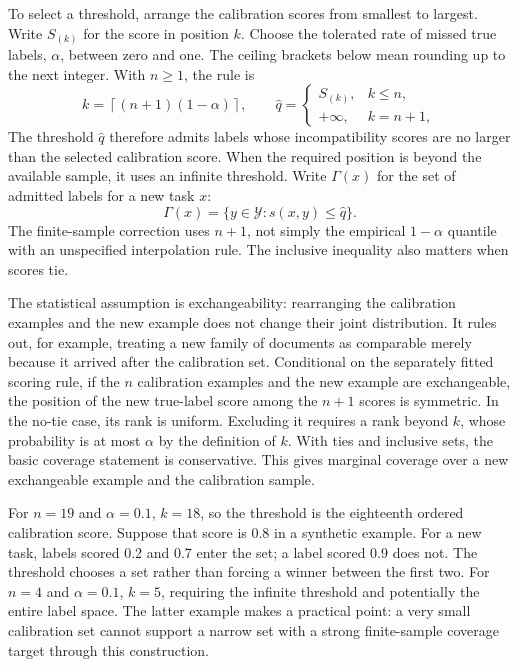 To select a threshold, arrange the calibration scores from smallest to largest.
Write $S_{(k)}$ for the score in position $k$. Choose the tolerated rate of missed
true labels, $\alpha$, between zero and one. The ceiling brackets below mean
rounding up to the next integer. With $n\geq1$, the rule is
\begin{equation}
 k=\left\lceil(n+1)(1-\alpha)\right\rceil,
 \qquad
 \widehat q=\begin{cases}
 S_{(k)},&k\leq n,\\
 +\infty,&k=n+1,
 \end{cases}
 \label{eq:conformal-quantile}
\end{equation}
The threshold $\widehat q$ therefore admits labels whose incompatibility scores
are no larger than the selected calibration score. When the required position is
beyond the available sample, it uses an infinite threshold. Write $\Gamma(x)$
for the set of admitted labels for a new task $x$:
\begin{equation}
 \Gamma(x)=\{y\in\mathcal Y:s(x,y)\leq\widehat q\}.
 \label{eq:conformal-set}
\end{equation}
The finite-sample correction uses $n+1$, not simply the empirical $1-\alpha$
quantile with an unspecified interpolation rule. The inclusive inequality also
matters when scores tie.

The statistical assumption is exchangeability: rearranging the calibration
examples and the new example does not change their joint distribution. It rules
out, for example, treating a new family of documents as comparable merely because
it arrived after the calibration set. Conditional on the separately fitted scoring rule, if the
$n$ calibration examples and the new example are exchangeable, the position of
the new true-label score among the $n+1$ scores is symmetric. In the no-tie case,
its rank is uniform. Excluding it requires a rank beyond $k$, whose probability
is at most $\alpha$ by the definition of $k$. With ties and inclusive sets, the
basic coverage statement is conservative. This gives marginal coverage over a
new exchangeable example and the calibration sample.


For $n=19$ and $\alpha=0.1$, $k=18$, so the threshold is the eighteenth ordered
calibration score. Suppose that score is 0.8 in a synthetic example. For a new
task, labels scored 0.2 and 0.7 enter the set; a label scored 0.9 does not. The
threshold chooses a set rather than forcing a winner between the first two.
For $n=4$ and $\alpha=0.1$, $k=5$, requiring the infinite
threshold and potentially the entire label space. The latter example makes a
practical point: a very small calibration set cannot support a narrow set with a
strong finite-sample coverage target through this construction.

